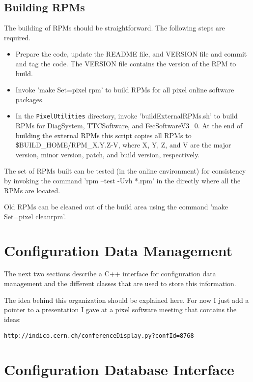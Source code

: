 \subsection{Building RPMs}

The building of RPMs should be straightforward. The
following steps are required.
\begin{itemize}
\item Prepare the code, update the README file, and VERSION file and
      commit and tag the code. The VERSION file contains the version
      of the RPM to build.
\item Invoke 'make Set=pixel rpm' to build RPMs for all pixel online software 
      packages.
\item In the {\tt PixelUtilities} directory, invoke 'buildExternalRPMs.sh'
      to build RPMs for DiagSystem, TTCSoftware, and FecSoftwareV3\_0.
      At the end of building the external RPMs this script copies
      all RPMs to \$BUILD\_HOME/RPM\_X.Y.Z-V, where X, Y, Z, and V are
      the major version, minor version, patch, and build version, 
      respectively.
\end{itemize}
The set of RPMs built can be tested (in the online environment) for
consistency by invoking the command 'rpm --test -Uvh *.rpm' in the directly
where all the RPMs are located.

Old RPMs can be cleaned out of the build area using the command 'make Set=pixel cleanrpm'.

\clearpage

\section{Configuration Data Management}

The next two sections describe a C++ interface
for configuration data management and the
different classes that are used to store this
information. 

The idea behind this organization should be
explained here. For now I just add a pointer
to a presentation I gave at a pixel software
meeting that contains the ideas:
\begin{verbatim}
http://indico.cern.ch/conferenceDisplay.py?confId=8768
\end{verbatim}

\section{Configuration Database Interface}

